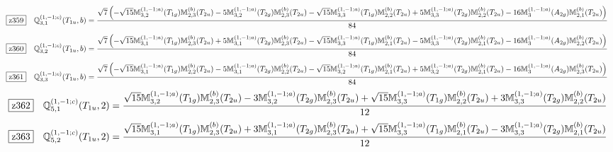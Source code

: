 \documentclass[fleqn,10pt,landscape]{jsarticle}
\begin{document}
\begin{dmath*}
\hspace*{3mm}\fbox{z359}\quad \mathbb{Q}_{3,1}^{(1,-1;c)}(T_{1u},b)=\frac{\sqrt{7} \left(- \sqrt{15} \mathbb{M}_{3,2}^{(1,-1;a)}(T_{1g}) \mathbb{M}_{2,3}^{(b)}(T_{2u}) - 5 \mathbb{M}_{3,2}^{(1,-1;a)}(T_{2g}) \mathbb{M}_{2,3}^{(b)}(T_{2u}) - \sqrt{15} \mathbb{M}_{3,3}^{(1,-1;a)}(T_{1g}) \mathbb{M}_{2,2}^{(b)}(T_{2u}) + 5 \mathbb{M}_{3,3}^{(1,-1;a)}(T_{2g}) \mathbb{M}_{2,2}^{(b)}(T_{2u}) - 16 \mathbb{M}_{3}^{(1,-1;a)}(A_{2g}) \mathbb{M}_{2,1}^{(b)}(T_{2u})\right)}{84}
\end{dmath*}
\begin{dmath*}
\hspace*{3mm}\fbox{z360}\quad \mathbb{Q}_{3,2}^{(1,-1;c)}(T_{1u},b)=\frac{\sqrt{7} \left(- \sqrt{15} \mathbb{M}_{3,1}^{(1,-1;a)}(T_{1g}) \mathbb{M}_{2,3}^{(b)}(T_{2u}) + 5 \mathbb{M}_{3,1}^{(1,-1;a)}(T_{2g}) \mathbb{M}_{2,3}^{(b)}(T_{2u}) - \sqrt{15} \mathbb{M}_{3,3}^{(1,-1;a)}(T_{1g}) \mathbb{M}_{2,1}^{(b)}(T_{2u}) - 5 \mathbb{M}_{3,3}^{(1,-1;a)}(T_{2g}) \mathbb{M}_{2,1}^{(b)}(T_{2u}) - 16 \mathbb{M}_{3}^{(1,-1;a)}(A_{2g}) \mathbb{M}_{2,2}^{(b)}(T_{2u})\right)}{84}
\end{dmath*}
\begin{dmath*}
\hspace*{3mm}\fbox{z361}\quad \mathbb{Q}_{3,3}^{(1,-1;c)}(T_{1u},b)=\frac{\sqrt{7} \left(- \sqrt{15} \mathbb{M}_{3,1}^{(1,-1;a)}(T_{1g}) \mathbb{M}_{2,2}^{(b)}(T_{2u}) - 5 \mathbb{M}_{3,1}^{(1,-1;a)}(T_{2g}) \mathbb{M}_{2,2}^{(b)}(T_{2u}) - \sqrt{15} \mathbb{M}_{3,2}^{(1,-1;a)}(T_{1g}) \mathbb{M}_{2,1}^{(b)}(T_{2u}) + 5 \mathbb{M}_{3,2}^{(1,-1;a)}(T_{2g}) \mathbb{M}_{2,1}^{(b)}(T_{2u}) - 16 \mathbb{M}_{3}^{(1,-1;a)}(A_{2g}) \mathbb{M}_{2,3}^{(b)}(T_{2u})\right)}{84}
\end{dmath*}
\begin{dmath*}
\hspace*{3mm}\fbox{z362}\quad \mathbb{Q}_{5,1}^{(1,-1;c)}(T_{1u},2)=\frac{\sqrt{15} \mathbb{M}_{3,2}^{(1,-1;a)}(T_{1g}) \mathbb{M}_{2,3}^{(b)}(T_{2u}) - 3 \mathbb{M}_{3,2}^{(1,-1;a)}(T_{2g}) \mathbb{M}_{2,3}^{(b)}(T_{2u}) + \sqrt{15} \mathbb{M}_{3,3}^{(1,-1;a)}(T_{1g}) \mathbb{M}_{2,2}^{(b)}(T_{2u}) + 3 \mathbb{M}_{3,3}^{(1,-1;a)}(T_{2g}) \mathbb{M}_{2,2}^{(b)}(T_{2u})}{12}
\end{dmath*}
\begin{dmath*}
\hspace*{3mm}\fbox{z363}\quad \mathbb{Q}_{5,2}^{(1,-1;c)}(T_{1u},2)=\frac{\sqrt{15} \mathbb{M}_{3,1}^{(1,-1;a)}(T_{1g}) \mathbb{M}_{2,3}^{(b)}(T_{2u}) + 3 \mathbb{M}_{3,1}^{(1,-1;a)}(T_{2g}) \mathbb{M}_{2,3}^{(b)}(T_{2u}) + \sqrt{15} \mathbb{M}_{3,3}^{(1,-1;a)}(T_{1g}) \mathbb{M}_{2,1}^{(b)}(T_{2u}) - 3 \mathbb{M}_{3,3}^{(1,-1;a)}(T_{2g}) \mathbb{M}_{2,1}^{(b)}(T_{2u})}{12}
\end{dmath*}
\end{document}
